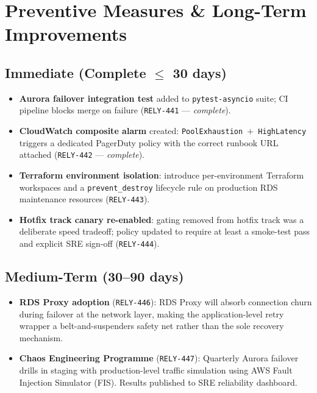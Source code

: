 \section{Preventive Measures \& Long-Term Improvements}

\subsection{Immediate (Complete $\leq$ 30 days)}

\begin{itemize}[leftmargin=*, itemsep=3pt]
  \item[\textcolor{accent}{\faIcon{check-square}}]
    \textbf{Aurora failover integration test} added to \texttt{pytest-asyncio} suite;
    CI pipeline blocks merge on failure (\texttt{RELY-441} --- \textit{complete}).

  \item[\textcolor{accent}{\faIcon{check-square}}]
    \textbf{CloudWatch composite alarm} created: \texttt{PoolExhaustion $+$ HighLatency}
    triggers a dedicated PagerDuty policy with the correct runbook URL attached
    (\texttt{RELY-442} --- \textit{complete}).

  \item[\textcolor{sev2}{\faIcon{hourglass-half}}]
    \textbf{Terraform environment isolation}: introduce per-environment Terraform
    workspaces and a \texttt{prevent\_destroy} lifecycle rule on production RDS
    maintenance resources (\texttt{RELY-443}).

  \item[\textcolor{sev2}{\faIcon{hourglass-half}}]
    \textbf{Hotfix track canary re-enabled}: gating removed from hotfix track was a
    deliberate speed tradeoff; policy updated to require at least a smoke-test pass
    and explicit SRE sign-off (\texttt{RELY-444}).
\end{itemize}

\subsection{Medium-Term (30--90 days)}

\begin{itemize}[leftmargin=*, itemsep=3pt]
  \item[\textcolor{statusopen}{\faIcon{circle}}]
    \textbf{RDS Proxy adoption} (\texttt{RELY-446}): RDS Proxy will absorb connection
    churn during failover at the network layer, making the application-level retry
    wrapper a belt-and-suspenders safety net rather than the sole recovery mechanism.

  \item[\textcolor{statusopen}{\faIcon{circle}}]
    \textbf{Chaos Engineering Programme} (\texttt{RELY-447}): Quarterly Aurora
    failover drills in staging with production-level traffic simulation using AWS
    Fault Injection Simulator (FIS). Results published to SRE reliability dashboard.
\end{itemize}

